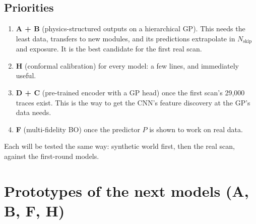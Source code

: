 \documentclass[10pt]{article}
\begin{document}
\subsection*{Priorities}
\begin{enumerate}
\item \textbf{A + B} (physics-structured outputs on a hierarchical GP). This needs the least data, transfers to new modules, and its
  predictions extrapolate in $N_\text{skip}$ and exposure. It is the best candidate for the first real scan.
\item \textbf{H} (conformal calibration) for every model: a few lines, and immediately useful.
\item \textbf{D + C} (pre-trained encoder with a GP head) once the first scan's 29{,}000 traces exist. This is the way to get the CNN's
  feature discovery at the GP's data needs.
\item \textbf{F} (multi-fidelity BO) once the predictor $P$ is shown to work on real data.
\end{enumerate}
Each will be tested the same way: synthetic world first, then the real scan, against the first-round models.

\section{Prototypes of the next models (A, B, F, H)}
\label{sec:proto}
\end{document}
